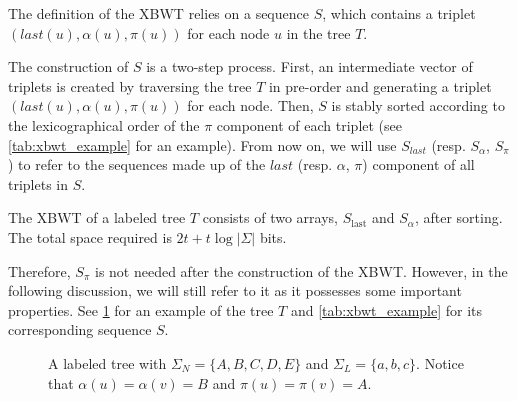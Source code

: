 The definition of the XBWT relies on a sequence $S$, which contains a triplet \\ 
$(last(u), \alpha(u), \pi(u))$ for each node $u$ in the tree $T$.

The construction of $S$ is a two-step process. First, an intermediate vector of triplets is created by traversing the tree $T$ in pre-order and generating a triplet $(last(u), \alpha(u), \pi(u))$ for each node. Then, $S$ is stably sorted according to the lexicographical order of the $\pi$ component of each triplet (see \cref{tab:xbwt_example} for an example).
From now on, we will use $S_{last}$ (resp. $S_{\alpha}$, $S_{\pi}$) to refer to the sequences made up of the $last$ (resp. $\alpha$, $\pi$) component of all triplets in $S$.

\begin{theorem}
    The XBWT of a labeled tree $T$ consists of two arrays, $S_{\text{last}}$ and $S_{\alpha}$, after sorting.
    The total space required is $2t + t \log |\Sigma|$ bits.
\end{theorem}

Therefore, $S_{\pi}$ is not needed after the construction of the XBWT. However, in the following discussion, we will still refer to it as it possesses some important properties. See \cref{fig:example_tree} for an example of the tree $T$ and \cref{tab:xbwt_example} for its corresponding sequence $S$.

\begin{figure}[ht]
    \centering
    
    \caption{A labeled tree with $\Sigma_N = \{A, B, C, D, E\}$ and $\Sigma_L = \{a, b, c\}$. Notice that $\alpha(u) = \alpha(v) = B$ and $\pi(u) = \pi(v) = A$.}
    \label{fig:example_tree}
\end{figure}

